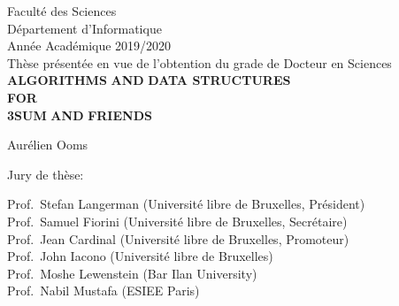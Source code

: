 \vspace*{\fill}
\begin{center}
Facult\'{e} des Sciences\\[1.5pt]
D\'{e}partement d'Informatique \\[1.5pt]
Ann\'{e}e Acad\'{e}mique 2019/2020 \\[1cm]
Th\`{e}se pr\'{e}sent\'{e}e en vue de l'obtention du grade de Docteur en Sciences \\[2cm]
{\fontsize{16}{24}\selectfont\bfseries{}ALGORITHMS}
{\fontsize{12}{24}\selectfont\bfseries{}AND}
{\fontsize{16}{24}\selectfont\bfseries{}DATA STRUCTURES}\\[12pt]
{\fontsize{12}{24}\selectfont\bfseries{}FOR}\\[12pt]
{\fontsize{16}{24}\selectfont\bfseries{}3SUM}
{\fontsize{12}{24}\selectfont\bfseries{}AND}
{\fontsize{16}{24}\selectfont\bfseries{}FRIENDS}
\end{center}

\begin{center}
\vspace{1cm}
{\large Aurélien Ooms} \\[2cm]
\end{center}

\begin{center}
	Jury de th\`{e}se:
\end{center}
\begin{flushleft}
Prof.~Stefan Langerman (Université libre de Bruxelles, Président) \\
Prof.~Samuel Fiorini (Université libre de Bruxelles, Secrétaire) \\
Prof.~Jean Cardinal (Université libre de Bruxelles, Promoteur) \\
Prof.~John Iacono (Université libre de Bruxelles) \\
Prof.~Moshe Lewenstein (Bar Ilan University) \\
Prof.~Nabil Mustafa (ESIEE Paris)
\end{flushleft}
\vspace*{\fill}
